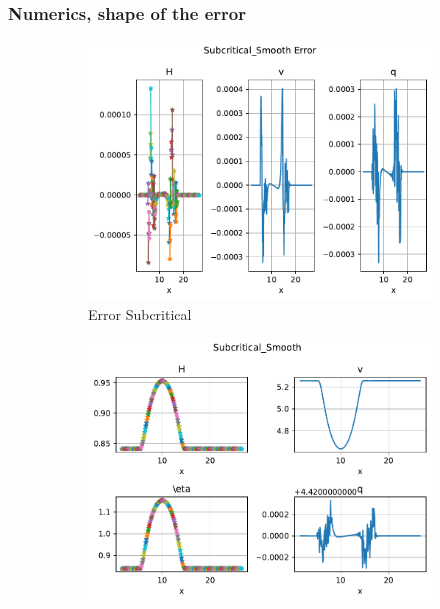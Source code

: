 \documentclass[pt12]{beamer}
\begin{document}
\begin{frame}
\frametitle{Numerics, shape of the error}

\vspace{-0.4cm}

\begin{figure}
     \centering
     \begin{subfigure}[b]{0.39\textwidth}
         \centering
         \includegraphics[width=\textwidth]{figures/debug/sub/error_lagr.pdf}
         \caption{Error Subcritical}
     \end{subfigure}
     \begin{subfigure}[b]{0.39\textwidth}
         \centering
         \includegraphics[width=\textwidth]{figures/debug/sub/values_lagr.pdf}

\end{subfigure}
\end{figure}
\end{frame}
\end{document}
